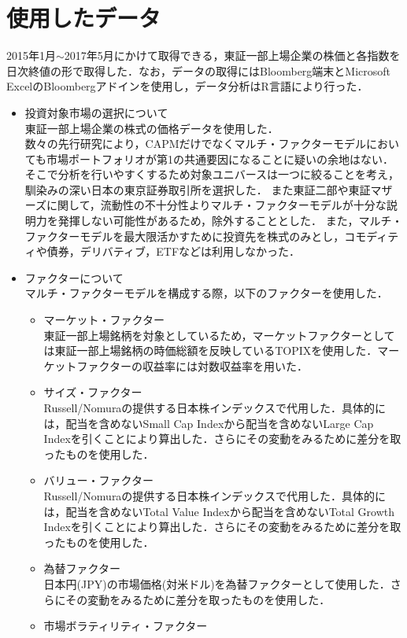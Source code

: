 \documentclass[11pt]{jreport}
\begin{document}
\section{使用したデータ}
2015年1月$\sim$2017年5月にかけて取得できる，東証一部上場企業の株価と各指数を日次終値の形で取得した．なお，データの取得にはBloomberg端末とMicrosoft ExcelのBloombergアドインを使用し，データ分析はR言語により行った．
\begin{itemize}
\item 投資対象市場の選択について\\
\quad 東証一部上場企業の株式の価格データを使用した．\\
\quad 数々の先行研究により，CAPMだけでなくマルチ・ファクターモデルにおいても市場ポートフォリオが第1の共通要因になることに疑いの余地はない．
そこで分析を行いやすくするため対象ユニバースは一つに絞ることを考え，馴染みの深い日本の東京証券取引所を選択した．
また東証二部や東証マザーズに関して，流動性の不十分性よりマルチ・ファクターモデルが十分な説明力を発揮しない可能性があるため，除外することとした．
また，マルチ・ファクターモデルを最大限活かすために投資先を株式のみとし，コモディティや債券，デリバティブ，ETFなどは利用しなかった．
\item ファクターについて\\
マルチ・ファクターモデルを構成する際，以下のファクターを使用した．
\begin{itemize}
\item マーケット・ファクター\\
東証一部上場銘柄を対象としているため，マーケットファクターとしては東証一部上場銘柄の時価総額を反映しているTOPIXを使用した．マーケットファクターの収益率には対数収益率を用いた．
\item サイズ・ファクター\\
Russell/Nomuraの提供する日本株インデックスで代用した．具体的には，配当を含めないSmall Cap Indexから配当を含めないLarge Cap Indexを引くことにより算出した．さらにその変動をみるために差分を取ったものを使用した．
\item バリュー・ファクター\\
Russell/Nomuraの提供する日本株インデックスで代用した．具体的には，配当を含めないTotal Value Indexから配当を含めないTotal Growth Indexを引くことにより算出した．さらにその変動をみるために差分を取ったものを使用した．
\item 為替ファクター\\
日本円(JPY)の市場価格(対米ドル)を為替ファクターとして使用した．さらにその変動をみるために差分を取ったものを使用した．
\item 市場ボラティリティ・ファクター\\

\end{itemize}
\end{itemize}
\end{document}
